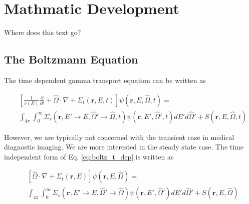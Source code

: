 

\section{Mathmatic Development}

Where does this text go?

\subsection{The Boltzmann Equation}

The time dependent gamma transport equation can be written as

\begin{equation} \label{eq:boltz_t_dep}
\begin{split}
	&\left[ \frac{1}{v(E)} \frac{\partial}{\partial t} + \hat{\Omega} \cdot \nabla + \Sigma_t(\boldsymbol{r}, E, t) \right]
	\psi(\boldsymbol{r}, E, \hat{\Omega}, t) = \\
	&\int_{4 \pi} \int_0^\infty \Sigma_s(\boldsymbol{r}, E' \rightarrow E, \hat{\Omega}' \rightarrow \hat{\Omega}, t) \psi(\boldsymbol{r}, E', \hat{\Omega}', t) dE' d\hat{\Omega}' + S(\boldsymbol{r}, E, \hat{\Omega}, t)
\end{split}
\end{equation}

However, we are typically not concerned with the transient case in medical diagnostic imaging. We are more interested in the steady state case. The time independent form of Eq. \ref{eq:boltz_t_dep} is written as

\begin{equation} \label{eq:boltz}
\begin{split}
	&\left[ \hat{\Omega} \cdot \nabla + \Sigma_t(\boldsymbol{r}, E) \right]
	\psi(\boldsymbol{r}, E, \hat{\Omega}) = \\
	&\int_{4 \pi} \int_0^\infty \Sigma_s(\boldsymbol{r}, E' \rightarrow E, \hat{\Omega}' \rightarrow \hat{\Omega}) \psi(\boldsymbol{r}, E', \hat{\Omega}') dE' d\hat{\Omega}' + S(\boldsymbol{r}, E, \hat{\Omega})
\end{split}
\end{equation}

